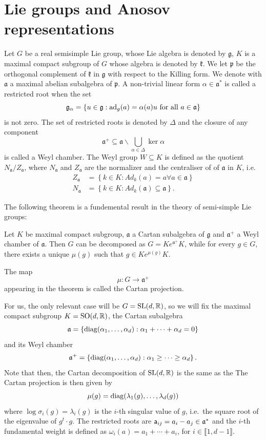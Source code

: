 \documentclass{report}
\begin{document}
\section{Lie groups and Anosov representations}\label{sec:lie_groups}
Let $G$ be a real semisimple Lie group, whose Lie algebra is denoted by $\mathfrak g$, $K$ is a maximal compact subgroup of $G$ whose algebra is denoted by $\mathfrak k$.
We let $\mathfrak p$ be the orthogonal complement of $\mathfrak k$ in $\mathfrak g$ with respect to the Killing form.
We denote with $\mathfrak a$ a maximal abelian subalgebra of $\mathfrak p$.
A non-trivial linear form $\alpha \in \mathfrak a^*$ is called a restricted root when the set
\[
\mathfrak g_\alpha = \left\{
    u \in \mathfrak g : \operatorname{ad}_g(a) = \alpha(a) u \text{ for all } a \in \mathfrak a
\right\}
\] 
is not zero.
The set of restricted roots is denoted by $\Delta$ and the closure of any component
\[
\mathfrak a^+ \subseteq \mathfrak a \backslash \bigcup_{\alpha \in \Delta} \ker \alpha
\]
is called a Weyl chamber.
The Weyl group $W \subseteq K$ is defined as the quotient $N_{\mathfrak a}/Z_{\mathfrak a}$, where $N_{\mathfrak a}$ and $Z_{\mathfrak a}$ are the normalizer and the centraliser of of $\mathfrak a$ in $K$, i.e.
\begin{align*}
    Z_{\mathfrak a} &= \left\{ k \in K: Ad_k(a) = a \forall a \in \mathfrak a \right\}\\
    N_{\mathfrak a} &= \left\{ k \in K: Ad_k(\mathfrak a) \subseteq \mathfrak a \right\}.
\end{align*}


The following theorem is a fundemental result in the theory of semi-simple Lie groups:
\begin{theorem}
Let $K$ be maximal compact subgroup, $\mathfrak a$ a Cartan subalgebra  of $\mathfrak g$ and $\mathfrak a^+$ a Weyl chamber of $\mathfrak a$.
Then $G$ can be decomposed as $G = K e^{\mathfrak a^+} K$, while for every $g \in G$, there exists a unique $\mu(g)$ such that $g \in K e^{\mu(g)} K$.    
\end{theorem}

The map
\[
\mu: G \to \mathfrak a^+
\] 
appearing in the theorem is called the Cartan projection.

For us, the only relevant case will be $G = \operatorname{{\mathrm{SL}}}(d, \mathbb R)$, so we will fix the maximal compact subgroup $K = \operatorname{{\mathrm{SO}}}(d, \mathbb R)$, the Cartan subalgebra
\[
    \mathfrak a = \left\{
        \operatorname{diag}(\alpha_1, \ldots, \alpha_d) : \alpha_1 + \cdots + \alpha_d = 0
    \right\}
\]
and its Weyl chamber
\[
    \mathfrak a^+ = \left\{
        \operatorname{diag}(\alpha_1, \ldots, \alpha_d) : \alpha_1 \geq \cdots \geq \alpha_d
    \right\}.
\]
Note that then, the Cartan decomposition of $\operatorname{{\mathrm{SL}}}(d, \mathbb R)$ is the same as the 
The Cartan projection is then given by
\[
\mu(g) = \operatorname{diag}(\lambda_1(g), \ldots, \lambda_d(g))
\]
where $\log \sigma_i(g) = \lambda_i(g)$ is the $i$-th singular value of $g$, i.e.\ the square root of the eigenvalue of $g^t \cdot g$.
The restricted roots are ${\sf a}_{ij} = a_i - a_j \in \mathfrak a^*$ and the $i$-th fundamental weight is defined as $\omega_{i}(a) = a_1 + \cdots + a_i$, for $i \in \llbracket 1, d - 1\rrbracket$.
\end{document}

